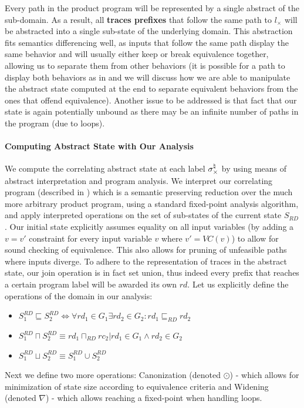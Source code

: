 Every path in the product program will be represented by a single abstract of the sub-domain. As a result, all \textbf{traces prefixes} that follow the same path to $l_{\times}$ will be abstracted into a single sub-state of the underlying domain. This abstraction fits semantics differencing well, as inputs that follow the same path display the same behavior and will usually either keep or break equivalence together, allowing us to separate them from other behaviors (it is possible for a path to display both behaviors as in  and we will discuss how we are able to manipulate the abstract state computed at the end to separate equivalent behaviors from the ones that offend equivalence). Another issue to be addressed is that fact that our state is again potentially unbound as there may be an infinite number of paths in the program (due to loops).

\paragraph{Computing Abstract State with Our Analysis} 
We compute the correlating abstract state at each label $\sigma_{\times}^\natural$ by using means of abstract interpretation and program analysis. We interpret our correlating program (described in ) which is a semantic preserving reduction over the much more arbitrary product program, using a standard fixed-point analysis algorithm, and apply interpreted operations on the set of sub-states of the current state $S_{RD}$. Our initial state explicitly assumes equality on all input variables (by adding a $v=v'$ constraint for every input variable $v$ where $v'=VC(v)$) to allow for sound checking of equivalence. This also allows for pruning of unfeasible paths where inputs diverge. To adhere to the representation of traces in the abstract state, our join operation is in fact set union, thus indeed every prefix that reaches a certain program label will be awarded its own $rd$. Let us explicitly define the operations of the domain in our analysis:
\begin{itemize}
\item $S^{RD}_1 \sqsubseteq S^{RD}_2 \Longleftrightarrow \forall rd_1 \in G_1 \exists rd_2 \in G_2 : rd_1 \sqsubseteq_{RD} rd_2$
\item $S^{RD}_1 \sqcap S^{RD}_2 \equiv { rd_1 \sqcap_{RD} rc_2 | rd_1 \in G_1 \wedge rd_2 \in G_2}$
\item $S^{RD}_1 \sqcup S^{RD}_2 \equiv S^{RD}_1 \cup S^{RD}_2$
\end{itemize}
Next we define two more operations: Canonization (denoted $\odot$) - which allows for minimization of state size according to equivalence criteria and Widening (denoted $\nabla$) - which allows reaching a fixed-point when handling loops.

